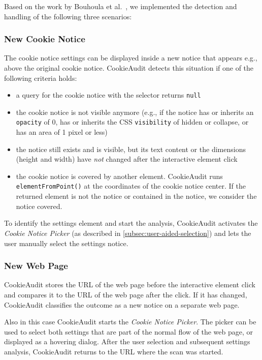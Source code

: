 Based on the work by Bouhoula et al.~\cite{bouhoula2023automated}, we implemented the detection and handling of the following three scenarios:

\subsubsection{New Cookie Notice}
The cookie notice settings can be displayed inside a new notice that appears e.g., above the original cookie notice. 
CookieAudit detects this situation if one of the following criteria holds:

\begin{itemize} 
    \item a query for the cookie notice with the selector returns \verb|null|
    \item the cookie notice is not visible anymore (e.g., if the notice has or inherits an \verb|opacity| of 0, has or inherits the CSS \verb|visibility| of hidden or collapse, or has an area of 1 pixel or less) 
    \item the notice still exists and is visible, but its text content or the dimensions (height and width) have \emph{not} changed after the interactive element click
    \item the cookie notice is covered by another element. CookieAudit runs \verb|elementFromPoint()| at the coordinates of the cookie notice center. If the returned element is not the notice or contained in the notice, we consider the notice covered.
\end{itemize}

To identify the settings element and start the analysis, CookieAudit activates the \emph{Cookie Notice Picker} (as described in \cref{subsec:user-aided-selection}) and lets the user manually select the settings notice.

\subsubsection{New Web Page}
CookieAudit stores the URL of the web page before the interactive element click and compares it to the URL of the web page after the click.
If it has changed, CookieAudit classifies the outcome as a new notice on a separate web page.

Also in this case CookieAudit starts the \emph{Cookie Notice Picker}. 
The picker can be used to select both settings that are part of the normal flow of the web page, or displayed as a hovering dialog.
After the user selection and subsequent settings analysis, CookieAudit returns to the URL where the scan was started.

